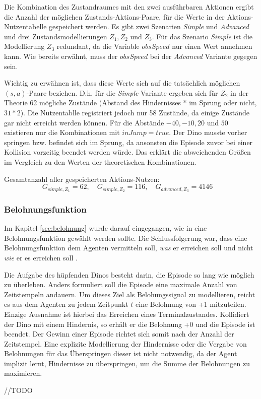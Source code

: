 Die Kombination des Zustandraumes mit den zwei ausführbaren Aktionen ergibt die Anzahl der möglichen Zustands-Aktions-Paare, für die Werte in der Aktions-Nutzentabelle gespeichert werden. Es gibt zwei Szenarien \textit{Simple} und \textit{Advanced} und drei Zustandsmodellierungen $Z_1, Z_2$ und $Z_3$.
Für das Szenario \textit{Simple} ist die Modellierung $Z_3$ redundant, da die Variable $obsSpeed$ nur einen Wert annehmen kann. Wie bereits erwähnt, muss der $obsSpeed$ bei der \textit{Advanced} Variante gegegen sein. 
\par 
Wichtig zu erwähnen ist, dass diese Werte sich auf die tatsächlich möglichen $(s,a)$-Paare beziehen. D.h. für die \textit{Simple} Variante ergeben sich für $Z_2$ in der Theorie 62 mögliche Zustände (Abstand des Hindernisses * im Sprung oder nicht, $31*2$). Die Nutzentablle registriert jedoch nur 58 Zustände, da einige Zustände gar nicht erreicht werden können. Für die Abstände $-40, -10, 20$ und $50$ existieren nur die Kombinationen mit $inJump = true$. Der Dino musste vorher springen bzw. befindet sich im Sprung, da ansonsten die Episode zuvor bei einer Kollision vorzeitig beendet werden würde. Das erklärt die abweichenden Größen im Vergleich zu den Werten der theoretischen Kombinationen.
\par 
Gesamtanzahl aller gespeicherten Aktions-Nutzen:
\begin{equation}
G_{simple, Z_1} = 62, \quad
G_{simple, Z_2} = 116, \quad
G_{advanced, Z_3} = 4146 \quad 
\end{equation}


\subsubsection{Belohnungsfunktion}
Im Kapitel \ref{sec:belohnung} wurde darauf eingegangen, wie in eine Belohnungsfunktion gewählt werden sollte. Die Schlussfolgerung war, dass eine Belohnungsfunktion dem Agenten vermitteln soll, \textit{was} er erreichen soll und nicht \textit{wie} er es erreichen soll \cite[S.~54]{Sutton1998}.
\par 
Die Aufgabe des hüpfenden Dinos besteht darin, die Episode so lang wie möglich zu überleben. Anders formuliert soll die Episode eine maximale Anzahl von Zeitstempeln andauern. Um dieses Ziel als Belohungssignal zu modellieren, reicht es aus dem Agenten zu jedem Zeitpunkt $t$ eine Belohnung von +1 mitzuteilen. Einzige Ausnahme ist hierbei das Erreichen eines Terminalzustandes. Kollidiert der Dino mit einem Hindernis, so erhält er die Belohnung +0 und die Episode ist beendet. Der Gewinn einer Episode richtet sich somit nach der Anzahl der Zeitstempel. Eine explizite Modellierung der Hindernisse oder die Vergabe von Belohnungen für das Überspringen dieser ist nicht notwendig, da der Agent implizit lernt, Hindernisse zu überspringen, um die Summe der Belohnungen zu maximieren. 
\par 
//TODO
\par 
